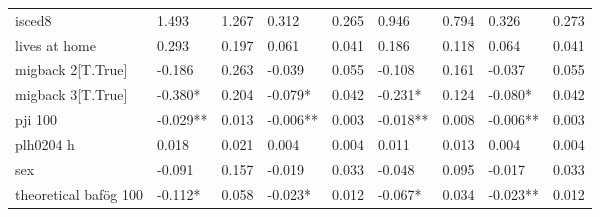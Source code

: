 \begin{table}
\begin{tabular}{lllllllll}
isced8                  & 1.493     & 1.267     & 0.312      & 0.265      & 0.946     & 0.794      & 0.326      & 0.273     \\
lives at home           & 0.293     & 0.197     & 0.061      & 0.041      & 0.186     & 0.118      & 0.064      & 0.041     \\
migback 2[T.True]       & -0.186    & 0.263     & -0.039     & 0.055      & -0.108    & 0.161      & -0.037     & 0.055     \\
migback 3[T.True]       & -0.380*   & 0.204     & -0.079*    & 0.042      & -0.231*   & 0.124      & -0.080*    & 0.042     \\
pji 100                 & -0.029**  & 0.013     & -0.006**   & 0.003      & -0.018**  & 0.008      & -0.006**   & 0.003     \\
plh0204 h               & 0.018     & 0.021     & 0.004      & 0.004      & 0.011     & 0.013      & 0.004      & 0.004     \\
sex                     & -0.091    & 0.157     & -0.019     & 0.033      & -0.048    & 0.095      & -0.017     & 0.033     \\
theoretical bafög 100   & -0.112*   & 0.058     & -0.023*    & 0.012      & -0.067*   & 0.034      & -0.023**   & 0.012     \\
\bottomrule
\end{tabular}
\end{table}
